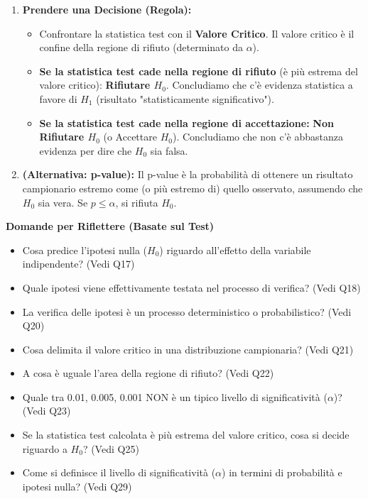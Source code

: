 \documentclass[12pt, a4paper]{article}
\newenvironment{reflectionbox}{%
    \medskip %
    \begin{framed}\par\noindent
    \textbf{\color{boxtitlecolor}Domande per Riflettere (Basate sul Test)} \par
    \begin{itemize}[leftmargin=*, label=$\blacktriangleright$]
}{%
    \end{itemize}\par
    \end{framed}
    \medskip %
}
\newcommand{\alphaerr}{\alpha} %
\newcommand{\Hnull}{H_0} %
\newcommand{\Halt}{H_1} %
\begin{document}
\begin{enumerate}
    \item \textbf{Prendere una Decisione (Regola):}
        \begin{itemize}
            \item Confrontare la statistica test con il \textbf{Valore Critico}. Il valore critico è il confine della regione di rifiuto (determinato da $\alphaerr$).
            \item \textbf{Se la statistica test cade nella regione di rifiuto} (è più estrema del valore critico): \textbf{Rifiutare $\Hnull$}. Concludiamo che c'è evidenza statistica a favore di $\Halt$ (risultato "statisticamente significativo").
            \item \textbf{Se la statistica test cade nella regione di accettazione:} \textbf{Non Rifiutare $\Hnull$} (o Accettare $\Hnull$). Concludiamo che non c'è abbastanza evidenza per dire che $\Hnull$ sia falsa.
        \end{itemize}
    \item \textbf{(Alternativa: p-value):} Il p-value è la probabilità di ottenere un risultato campionario estremo come (o più estremo di) quello osservato, assumendo che $\Hnull$ sia vera. Se $p \le \alphaerr$, si rifiuta $\Hnull$.
\end{enumerate}

\begin{reflectionbox}
    \item Cosa predice l'ipotesi nulla ($\Hnull$) riguardo all'effetto della variabile indipendente? (Vedi Q17)
    \item Quale ipotesi viene effettivamente testata nel processo di verifica? (Vedi Q18)
    \item La verifica delle ipotesi è un processo deterministico o probabilistico? (Vedi Q20)
    \item Cosa delimita il valore critico in una distribuzione campionaria? (Vedi Q21)
    \item A cosa è uguale l'area della regione di rifiuto? (Vedi Q22)
    \item Quale tra 0.01, 0.005, 0.001 NON è un tipico livello di significatività ($\alphaerr$)? (Vedi Q23)
    \item Se la statistica test calcolata è più estrema del valore critico, cosa si decide riguardo a $\Hnull$? (Vedi Q25)
    \item Come si definisce il livello di significatività ($\alphaerr$) in termini di probabilità e ipotesi nulla? (Vedi Q29)
\end{reflectionbox}
\end{document}
